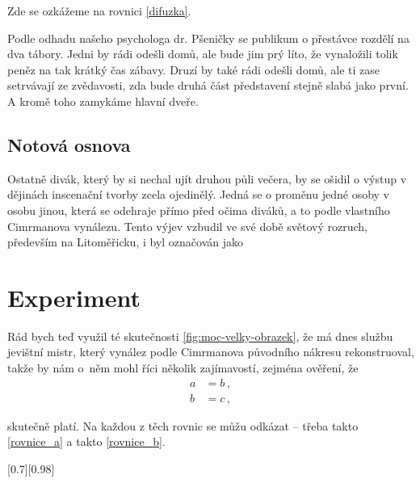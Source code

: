 \documentclass{cygclanek}
\begin{document}
Zde se ozkážeme na rovnici \eqref{difuzka}. 

Podle odhadu našeho psychologa
dr. Pšeničky se publikum o přestávce rozdělí na dva tábory. Jedni by rádi
odešli domů, ale bude jim prý líto, že vynaložili tolik peněz na tak krátký čas
zábavy. Druzí by také rádi odešli domů, ale ti zase setrvávají ze zvědavosti,
zda bude druhá část představení stejně slabá jako první. A kromě toho zamykáme
hlavní dveře.


\subsection{Notová osnova}
Ostatně divák, který by si nechal ujít druhou půli večera, by se ošidil o
výstup v dějinách inscenační tvorby zcela ojedinělý. Jedná se o proměnu jedné
osoby v osobu jinou, která se odehraje přímo před očima diváků, a to podle
vlastního Cimrmanova vynálezu. Tento výjev vzbudil ve své době světový rozruch,
především na Litoměřicku, i byl označován jako 


\section{Experiment}
Rád bych teď využil té skutečnosti \ref{fig:moc-velky-obrazek}, že má dnes
službu jevištní mistr, který vynález podle Cimrmanova původního nákresu
rekonstruoval, takže by nám o~něm mohl říci několik zajímavostí, zejména
ověření, že 
\begin{align}
  a &= b \label{rovnice_a} \,,\\
  b &= c \label{rovnice_b} \,,
\end{align}

skutečně platí. Na každou z těch rovnic se můžu odkázat -- třeba takto
\eqref{rovnice_a} a takto \eqref{rovnice_b}.



[0.7][0.98]
\end{document}
